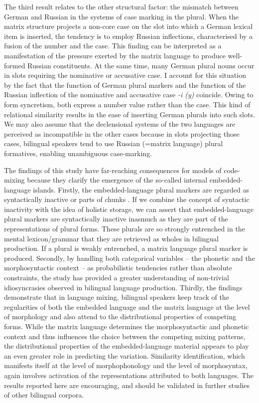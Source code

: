 The third result relates to the other structural factor: the mismatch between German and Russian in the systems of case marking in the plural. When the matrix structure projects a non-core case on the slot into which a German lexical item is inserted, the tendency is to employ Russian inflections, characterised by a fusion of the number and the case. This finding can be interpreted as a manifestation of the pressure exerted by the matrix language to produce well-formed Russian constituents. At the same time, many German plural nouns occur in slots requiring the nominative or accusative case. I account for this situation by the fact that the function of German plural markers and the function of the Russian inflection of the nominative and accusative case \textit{-i (y)} coincide. Owing to form syncretism, both express a number value rather than the case. This kind of relational similarity results in the ease of inserting German plurals into such slots. We may also assume that the declensional systems of the two languages are perceived as incompatible in the other cases because in slots projecting those cases, bilingual speakers tend to use Russian (=matrix language) plural formatives, enabling unambiguous case-marking.

The findings of this study have far-reaching consequences for models of code-mixing because they clarify the emergence of the so-called internal embedded-language islands. Firstly, the embedded-language plural markers are regarded as syntactically inactive \citep[92]{myers-scotton-contact-2002} or parts of chunks \citep[98]{backus-evidence-1999}. If we combine the concept of syntactic inactivity with the idea of holistic storage, we can assert that embedded-language plural markers are syntactically inactive inasmuch as they are part of the representations of plural forms. These plurals are so strongly entrenched in the mental lexicon/grammar that they are retrieved as wholes in bilingual production. If a plural is weakly entrenched, a matrix language plural marker is produced. Secondly, by handling both categorical variables -- the phonetic and the morphosyntactic context -- as probabilistic tendencies rather than absolute constraints, the study has provided a greater understanding of non-trivial idiosyncrasies observed in bilingual language production. Thirdly, the findings demonstrate that in language mixing, bilingual speakers keep track of the regularities of both the embedded language and the matrix language at the level of morphology and also attend to the distributional properties of competing forms. While the matrix language determines the morphosyntactic and phonetic context and thus influences the choice between the competing mixing patterns, the distributional properties of the embedded-language material appears to play an even greater role in predicting the variation. Similarity identification, which manifests itself at the level of morphophonology and the level of morphosyntax, again involves activation of the representations attributed to both languages. The results reported here are encouraging, and should be validated in further studies of other bilingual corpora.

